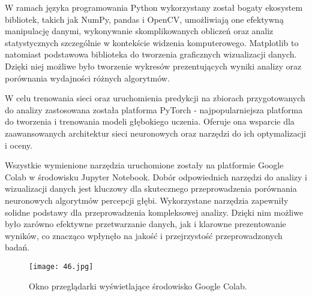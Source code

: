 W ramach języka programowania Python wykorzystany został bogaty ekosystem bibliotek, takich jak NumPy, pandas i OpenCV, umożliwiają one efektywną manipulację danymi, wykonywanie skomplikowanych obliczeń oraz analiz statystycznych szczególnie w kontekście widzenia komputerowego. Matplotlib to natomiast podstawowa biblioteka do tworzenia graficznych wizualizacji danych. Dzięki niej możliwe było tworzenie wykresów prezentujących wyniki analizy oraz porównania wydajności różnych algorytmów.

W celu trenowania sieci oraz uruchomienia predykcji na zbiorach przygotowanych do analizy zastosowana została platforma PyTorch - najpopularniejsza platforma do tworzenia i trenowania modeli głębokiego uczenia. Oferuje ona wsparcie dla zaawansowanych architektur sieci neuronowych oraz narzędzi do ich optymalizacji i oceny.

Wszystkie wymienione narzędzia uruchomione zostały na platformie Google Colab w środowisku Jupyter Notebook. Dobór odpowiednich narzędzi do analizy i wizualizacji danych jest kluczowy dla skutecznego przeprowadzenia porównania neuronowych algorytmów percepcji głębi. Wykorzystane narzędzia zapewniły solidne podstawy dla przeprowadzenia kompleksowej analizy. Dzięki nim możliwe było zarówno efektywne przetwarzanie danych, jak i klarowne prezentowanie wyników, co znacząco wpłynęło na jakość i przejrzystość przeprowadzonych badań.
\begin{figure}[H]
    \centering
    \texttt{[image: 46.jpg]}
    \caption{Okno przeglądarki wyświetlające środowisko Google Colab.}
    \label{fig:google-colab}
\end{figure}
